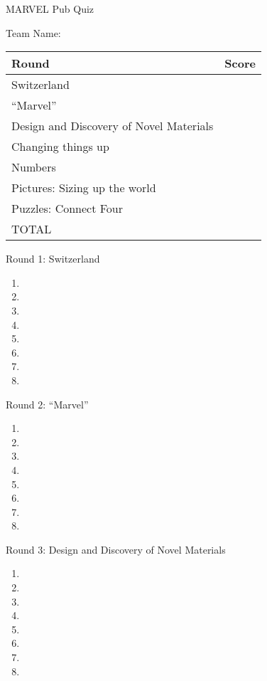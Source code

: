 

\centering
\Huge
MARVEL Pub Quiz
\vspace{2cm}

\LARGE
Team Name: \underline{\hphantom{XXXXXXXXXXXXXXXXXXXXXXXXXX}}

\vspace{3cm}

\LARGE
\begin{tabular}{ll}
\hline
Round & Score \\
\hline
Switzerland & \\
``Marvel'' & \\
Design and Discovery of Novel Materials & \\
Changing things up & \\
Numbers & \\
Pictures: Sizing up the world & \\
Puzzles: Connect Four & \\
TOTAL \\
\hline
\end{tabular}
\thispagestyle{empty}
\Huge
\newpage
\begin{center}
\Huge
Round 1: Switzerland
\end{center}
\large
\Huge
\begin{enumerate}
\item
\item
\item
\item
\item
\item
\item
\item
\end{enumerate}

\newpage
\begin{center}
\Huge
Round 2: ``Marvel''
\end{center}
\large
\Huge
\begin{enumerate}
\item
\item
\item
\item
\item
\item
\item
\item
\end{enumerate}

\newpage
\begin{center}
\Huge
Round 3: Design and Discovery of Novel Materials
\end{center}
\large
\Huge
\begin{enumerate}
\item
\item
\item
\item
\item
\item
\item
\item
\end{enumerate}

